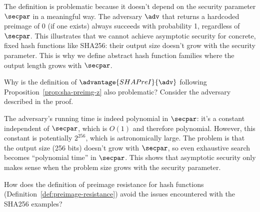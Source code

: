 \ifsolutions
\begin{mysolution}
  The definition is problematic because it doesn't depend on the security parameter $\secpar$ in a meaningful way.
  The adversary $\adv$ that returns a hardcoded preimage of 0 (if one exists) always succeeds with probability 1, regardless of $\secpar$.
  This illustrates that we cannot achieve asymptotic security for concrete, fixed hash functions like SHA256: their output size doesn't grow with the security parameter.
  This is why we define abstract hash function families where the output length grows with $\secpar$.
\end{mysolution}
\fi

\begin{exercise}\label{ex:sha-random-preimage-problem}
  Why is the definition of $\advantage{SHAPreI}{\adv}$ following Proposition~\ref{prop:sha-preimg-z} also problematic?
  Consider the adversary described in the proof.
\end{exercise}

\ifsolutions
\begin{mysolution}
  The adversary's running time is indeed polynomial in $\secpar$: it's a constant independent of $\secpar$, which is $O(1)$ and therefore polynomial.
  However, this constant is potentially $2^{256}$, which is astronomically large.
  The problem is that the output size (256 bits) doesn't grow with $\secpar$, so even exhaustive search becomes ``polynomial time'' in $\secpar$.
  This shows that asymptotic security only makes sense when the problem size grows with the security parameter.
\end{mysolution}
\fi

\begin{exercise}\label{ex:hash-function-definition}
  How does the definition of preimage resistance for hash functions (Definition~\ref{def:preimage-resistance}) avoid the issues encountered with the SHA256 examples?
\end{exercise}


